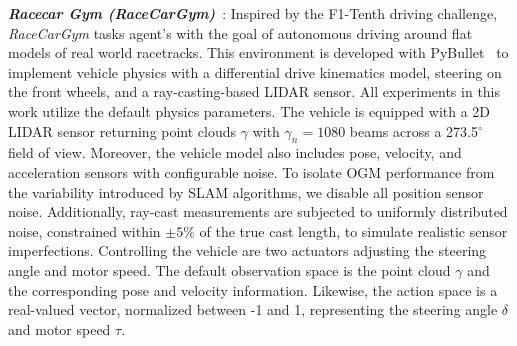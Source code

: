 \textbf{\textit{Racecar Gym (RaceCarGym)}}~\cite{Brunnbauer_racecar_gym}: Inspired by the F1-Tenth driving challenge, \textit{RaceCarGym} tasks agent's with the goal of autonomous driving around flat models of real world racetracks. This environment is developed with PyBullet~\cite{coumans2021} to implement vehicle physics with a differential drive kinematics model, steering on the front wheels, and a ray-casting-based LIDAR sensor. All experiments in this work utilize the default physics parameters. The vehicle is equipped with a 2D LIDAR sensor returning point clouds $\gamma$ with $\gamma_n=1080$ beams across a 273.5$^{\circ}$ field of view. Moreover, the vehicle model also includes pose, velocity, and acceleration sensors with configurable noise. To isolate OGM performance from the variability introduced by SLAM algorithms, we disable all position sensor noise. Additionally, ray-cast measurements are subjected to uniformly distributed noise, constrained within $\pm5\%$ of the true cast length, to simulate realistic sensor imperfections. Controlling the vehicle are two actuators adjusting the steering angle and motor speed. The default observation space is the point cloud $\gamma$ and the corresponding pose and velocity information. Likewise, the action space is a real-valued vector, normalized between -1 and 1, representing the steering angle $\delta$ and motor speed $\tau$.

